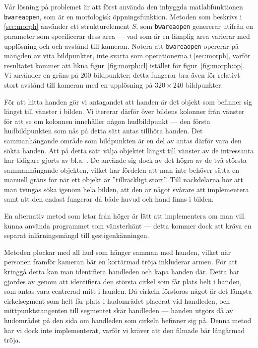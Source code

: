 Vår lösning på problemet är att först använda den inbyggda
matlabfunktionen \texttt{bwareaopen}, som är en morfologisk
öppningsfunktion. Metoden som beskrivs i
\ref{sec:morph} använder ett strukturelement $S$, som \texttt{bwareaopen}
genererar utifrån en parameter som specificerar
dess area --- vad som är en lämplig area
varierar med upplösning och
och avstånd till kameran. Notera att \texttt{bwareaopen} opererar på mängden av
vita bildpunkter, inte svarta som operationerna i \ref{sec:morph}, varför
resultatet kommer att likna figur~\ref{fig:morph:cl} istället för
figur~\ref{fig:morph:op}.
Vi använder en gräns på 200
bildpunkter; detta fungerar bra även för relativt stort avstånd till
kameran med en upplösning på $320\times240$ bildpunkter.

För att hitta handen gör vi antagandet att handen är det
objekt som befinner sig längst till vänster i bilden.
Vi itererar därför över bildens kolonner från
vänster för att se om kolonnen innehåller någon hudbildpunkt --- den första
hudbildpunkten som nås på detta sätt antas tillhöra handen.
Det sammanhängande område som bildpunkten är en del av antas därför vara
den sökta handen.
Att på detta sätt välja objektet längst till vänster av de
intressanta har tidigare gjorts av bl.a. . De använde
sig dock av det högra av de två största sammanhängande objekten,
vilket har fördelen att man inte behöver sätta en manuell gräns för
när ett objekt är ''tillräckligt stort''. Till nackdelarna hör
att man tvingas
söka igenom hela bilden, att den är något svårare att
implementera samt att den endast fungerar då både huvud och hand finns
i bilden.

En alternativ metod som letar från
höger är lätt att implementera om man vill kunna använda programmet
som vänsterhänt --- detta kommer dock att kräva en
separat inlärningsmängd till gestigenkänningen. 

Metoden plockar med all hud som hänger samman med
handen, vilket när personen framför kameran bär en kortärmad tröja inkluderar
armen. För att
kringgå detta kan man identifiera handleden och kapa handen
där. Detta har gjordes av  genom att identifiera den 
största cirkel
som får plats helt i handen, som antas vara centrerad mitt i handen. Då
cirkeln förstoras något är det längsta cirkelsegment som helt får
plats i hudområdet placerat vid handleden, och mittpunktstangenten
till segmentet skär handleden --- handen utgörs då av hudområdet på den
sida om handleden som cirkeln befinner sig på. Denna metod har vi dock
inte implementerat, varför vi kräver att den filmade bär
långärmad tröja. 
